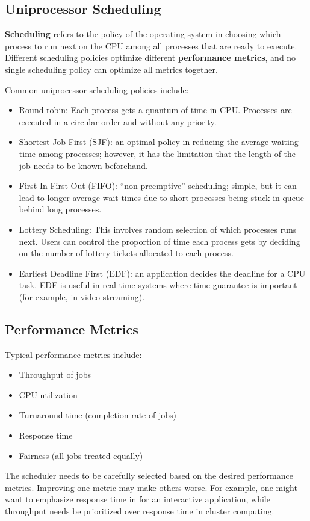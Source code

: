 \documentclass[twoside]{article}
\begin{document}
\subsection{Uniprocessor Scheduling}

\textbf{Scheduling} refers to the policy of the operating system in choosing which process to run next on the CPU among all processes that are ready to execute. Different scheduling policies optimize different \textbf{performance metrics}, and no single scheduling policy can optimize all metrics together. 

Common uniprocessor scheduling policies include:
\begin{itemize}
  \item Round-robin: Each process gets a quantum of time in CPU. Processes are executed in a circular order and without any priority.
  \item Shortest Job First (SJF): an optimal policy in reducing the average waiting time among processes; however, it has the limitation that the length of the job needs to be known beforehand. 
  \item First-In First-Out (FIFO): ``non-preemptive'' scheduling; simple, but it can lead to longer average wait times due to short processes being stuck in queue behind long processes.
  \item Lottery Scheduling: This involves random selection of which processes runs next. Users can control the proportion of time each process gets by deciding on the number of lottery tickets allocated to each process. 
  \item Earliest Deadline First (EDF): an application decides the deadline for a CPU task. EDF is useful in real-time systems where time guarantee is important (for example, in video streaming).
\end{itemize}

\subsection{Performance Metrics}
Typical performance metrics include:
\begin{itemize}
  \item Throughput of jobs
  \item CPU utilization
  \item Turnaround time (completion rate of jobs)
  \item Response time
  \item Fairness (all jobs treated equally)
\end{itemize}
The scheduler needs to be carefully selected based on the desired performance metrics. Improving one metric may make others worse. For example, one might want to emphasize response time in for an interactive application, while throughput needs be prioritized over response time in cluster computing.
\end{document}
